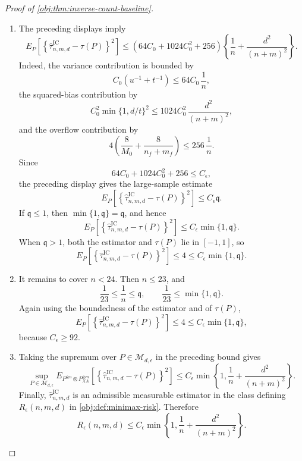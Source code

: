 \documentclass[11pt]{article}
\begin{document}
\begin{proof}[Proof of \cref{obj:thm:inverse-count-baseline}]
\begin{enumerate}
\item The preceding displays imply
\[
E_P\!\left[
\left\{\widehat\tau^{\mathrm{IC}}_{n,m,d}-\tau(P)\right\}^2
\right]
\le
\left(64C_0+1024C_0^2+256\right)
\left\{
\frac1n+\frac{d^2}{(n+m)^2}
\right\}.
\]
Indeed, the variance contribution is bounded by
\[
C_0(u^{-1}+t^{-1})\le 64C_0\,\frac1n,
\]
the squared-bias contribution by
\[
C_0^2\min\{1,d/t\}^2
\le
1024C_0^2\,\frac{d^2}{(n+m)^2},
\]
and the overflow contribution by
\[
4\left(\frac8{M_0}+\frac8{n_f+m_f}\right)
\le
256\,\frac1n .
\]
Since
\[
64C_0+1024C_0^2+256\le C_\epsilon,
\]
the preceding display gives the large-sample estimate
\[
E_P\!\left[
\left\{\widehat\tau^{\mathrm{IC}}_{n,m,d}-\tau(P)\right\}^2
\right]
\le
C_\epsilon\mathfrak q .
\]
If \(\mathfrak q\le1\), then \(\min\{1,\mathfrak q\}=\mathfrak q\), and hence
\[
E_P\!\left[
\left\{\widehat\tau^{\mathrm{IC}}_{n,m,d}-\tau(P)\right\}^2
\right]
\le
C_\epsilon\min\{1,\mathfrak q\}.
\]
When \(\mathfrak q>1\), both the estimator and \(\tau(P)\) lie in \([-1,1]\), so
\[
E_P\!\left[
\left\{\widehat\tau^{\mathrm{IC}}_{n,m,d}-\tau(P)\right\}^2
\right]\le4
\le C_\epsilon\min\{1,\mathfrak q\}.
\]

\item It remains to cover \(n<24\).  Then \(n\le23\), and
\[
\frac1{23}\le \frac1n\le \mathfrak q,
\qquad
\frac1{23}\le \min\{1,\mathfrak q\}.
\]
Again using the boundedness of the estimator and of \(\tau(P)\),
\[
E_P\!\left[
\left\{\widehat\tau^{\mathrm{IC}}_{n,m,d}-\tau(P)\right\}^2
\right]\le4
\le
C_\epsilon\min\{1,\mathfrak q\},
\]
because \(C_\epsilon\ge92\). %

\item Taking the supremum over \(P\in\mathcal M_{d,\epsilon}\) in the preceding bound gives
\[
\sup_{P\in\mathcal M_{d,\epsilon}}
E_{P^{\otimes n}\otimes P_{XA}^{\otimes m}}
\left[
\left\{
\widehat\tau^{\mathrm{IC}}_{n,m,d}-\tau(P)
\right\}^2
\right]
\le
C_\epsilon
\min\left\{
1,\frac1n+\frac{d^2}{(n+m)^2}
\right\}.
\]
Finally, \(\widehat\tau^{\mathrm{IC}}_{n,m,d}\) is an admissible measurable estimator in the class defining \(R_\epsilon(n,m,d)\) in \cref{obj:def:minimax-risk}.  Therefore
\[
R_\epsilon(n,m,d)
\le
C_\epsilon
\min\left\{
1,\frac1n+\frac{d^2}{(n+m)^2}
\right\}.
\]
\end{enumerate}
\end{proof}
\end{document}
